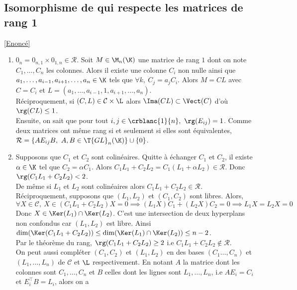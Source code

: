 \documentclass[8pt]{book}
\begin{document}
	\subsection{Isomorphisme de qui respecte les matrices de rang 1 }
	\label{Isomorphisme qui respecte les matrices de rang 1 corrigé}
	\textcolor{blue}{\hyperref[Isomorphisme qui respecte les matrices de rang 1]{[Enoncé]}}\\
	\begin{enumerate}[leftmargin=*]
		\item $0_n=0_{n,1}\times 0_{1,n}\in \mathcal R$.
		Soit $M\in \M_n(\K)$ une matrice de rang $1$ dont on note $C_1,\dots,C_n$ les colonnes. Alors il existe une colonne $C_i$ non nulle ainsi que $a_1,\dots,a_{i-1},a_{i+1},\dots,a_n\in \K$ tels que $\forall k,\ C_j=a_jC_i$. Alors $M=CL$ avec $C=C_i$ et $L=(a_1,\dots,a_{i-1},1,a_{i+1},\dots,a_n)$.\\
		Réciproquement, si $(C,L)\in \mathcal C\times \L$ alors $\Ima(CL)\subset \Vect(C)$ d'où $\rg(CL)\leq 1$.\\
		Ensuite, on sait que pour tout $i,j\in \crblanc{1}{n},\ \rg(E_{ij})=1$. Comme deux matrices ont même rang si et seulement si elles sont équivalentes, $\mathcal R=\{AE_{ij}B,\ A,B\in \T{GL}_n(\K)\}\cup\{0\}$.
		\item Supposons que $C_1$ et $C_2$ sont colinéaires. Quitte à échanger $C_1$ et $C_2$, il existe $\alpha\in \K$ tel que $C_2=\alpha C_1$. Alors $C_1L_1+C_2L_2=C_1(L_1+\alpha L_2)\in \mathcal R$. Donc $\rg(C_1L_1+C_2L_2)<2$.\\
		De même si $L_1$ et $L_2$ sont colinéaires alors $C_1L_1+C_2L_2\in \mathcal R$.\\
		Réciproquement, supposons que $(L_1,L_2)$ et $(C_1,C_2)$ sont libres. Alors,\\
		$$\forall X\in \mathcal C,\ X\in (C_1L_1+C_2L_2)X=0\implies (L_1X)C_1+(L_2X)C_2=0\implies L_1X=L_2X=0$$
		Donc $X\in \Ker(L_1)\cap\Ker(L_2)$. C'est une intersection de deux hyperplans non confondus car $(L_1,L_2)$ est libre. Ainsi $\dim(\Ker(C_1L_1+C_2L_2))\leq \dim(\Ker(L_1)\cap\Ker(L_2))\leq n-2$.\\
		Par le théorème du rang, $\rg(C_1L_1+C_2L_2)\geq 2$ i.e $C_1L_1+C_2L_2\notin \mathcal R$.\\
		On peut aussi compléter $(C_1,C_2)$ et $(L_1,L_2)$ en des bases $(C_1\dots,C_n)$ et $(L_1,\dots,L_n)$ de $\mathcal C$ et $\L$ respectivement. En notant $A$ la matrice dont les colonnes sont $C_1,\dots,C_n$ et $B$ celles dont les lignes sont $L_1,\dots,L_n$, i.e $AE_i=C_i$ et $E_i^\top B=L_i$, alors on a

\end{enumerate}
\end{document}
